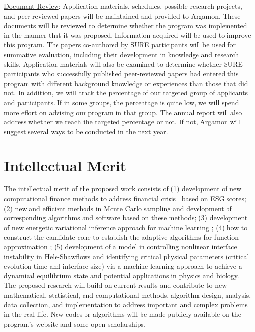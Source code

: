 \documentclass[11pt]{NSFamsart}
\newcommand{\Upara}[1]{\noindent\underline{\upshape #1}:}
\begin{document}
\Upara{Document Review} 
Application materials,  schedules,  possible research projects, and peer-reviewed papers will be maintained and provided
to Argamon. These documents will be reviewed to determine whether the program was implemented
in the manner that it was proposed. Information acquired will be used to improve this
program. The papers co-authored by SURE participants will be used for summative evaluation, including
their development in knowledge and research skills. Application materials will also be examined to
determine whether SURE participants who successfully published peer-reviewed papers had entered this
program with different background knowledge or experiences than those that did not.
In addition, we will track the percentage of our targeted group of applicants and participants. If in some groups, the percentage is quite low, we will spend more effort on advising our program in that group. The annual report will also address whether we reach the targeted percentage or not. If not, Argamon will suggest several ways to be conducted in the next year.  



\section{Intellectual Merit}
The intellectual merit of the proposed work consists of (1) development of new computational finance methods to address financial crisis  based on ESG scores; (2)
new and efficient methods in Monte Carlo sampling and development of corresponding algorithms and software based on these methods; (3) development of new energetic variational inference approach for machine learning ; (4) 
how to construct the candidate cone to establish the adaptive algorithms for function approximation
; (5) development of a model in controlling nonlinear interface instability in Hele-Shawflows and identifying critical physical parameters (critical evolution time and interface size) via a machine learning approach to achieve a dynamical equilibrium state and potential applications in physics and biology.
The proposed research will build on current results and contribute to new mathematical, statistical,
and computational methods, algorithm design, analysis, data collection, and implementation to address
important and complex problems in the real life. New codes or algorithms will be made publicly
available on the program’s website and some open scholarships.
\end{document}
